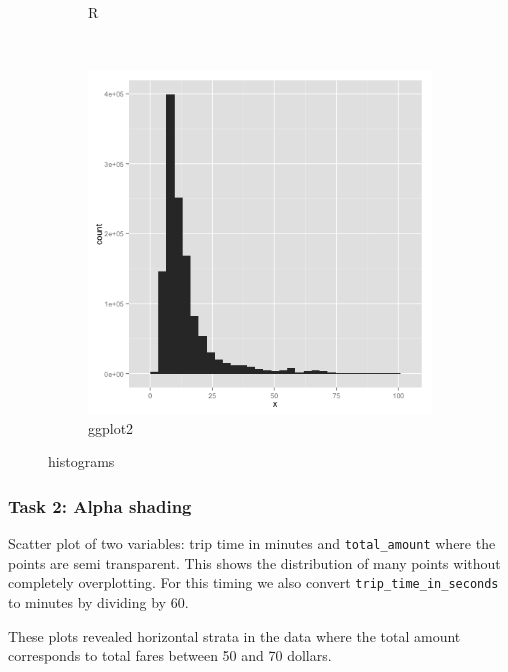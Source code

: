 \documentclass[]{article}
\begin{document}
\begin{figure}
\begin{subfigure}[b]{0.3\textwidth}
                \caption{R}
        \end{subfigure}
        ~ %
        \begin{subfigure}[b]{0.3\textwidth}
                \includegraphics[width=\textwidth]{ggplot2/histogram.png}
                \caption{ggplot2}
        \end{subfigure}
        \caption{histograms}
\end{figure}

\subsubsection{Task 2: Alpha shading}\label{task-2-alpha-shading}

Scatter plot of two variables: trip time in minutes and
\texttt{total\_amount} where the points are semi transparent. This shows
the distribution of many points without completely overplotting. For
this timing we also convert \texttt{trip\_time\_in\_seconds} to minutes
by dividing by 60.

These plots revealed horizontal strata in the data where the total
amount corresponds to total fares between 50 and 70 dollars.
\end{document}
